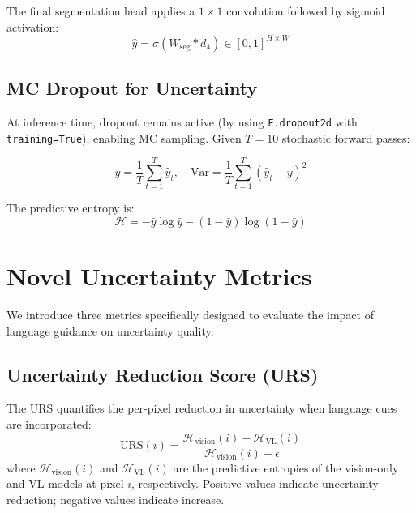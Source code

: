 The final segmentation head applies a $1 \times 1$ convolution followed by sigmoid activation:
\begin{equation}
	\hat{y} = \sigma(W_{\text{seg}} \ast d_4) \in [0, 1]^{H \times W}
\end{equation}


\subsection{MC Dropout for Uncertainty}
\label{sec:approach:mc_inference}

At inference time, dropout remains active (by using \texttt{F.dropout2d} with \texttt{training=True}), enabling \ac{MC} sampling. Given $T = 10$ stochastic forward passes:

\begin{equation}
	\bar{y} = \frac{1}{T}\sum_{t=1}^{T} \hat{y}_t, \quad
	\text{Var} = \frac{1}{T}\sum_{t=1}^{T} (\hat{y}_t - \bar{y})^2
\end{equation}

The predictive entropy is:
\begin{equation}
	\mathcal{H} = -\bar{y}\log\bar{y} - (1 - \bar{y})\log(1 - \bar{y})
\end{equation}


\section{Novel Uncertainty Metrics}
\label{sec:approach:metrics}

We introduce three metrics specifically designed to evaluate the impact of language guidance on uncertainty quality.

\subsection{Uncertainty Reduction Score (URS)}
\label{sec:approach:urs}

The \ac{URS} quantifies the per-pixel reduction in uncertainty when language cues are incorporated:
\begin{equation}
	\text{URS}(i) = \frac{\mathcal{H}_{\text{vision}}(i) - \mathcal{H}_{\text{VL}}(i)}{\mathcal{H}_{\text{vision}}(i) + \epsilon}
\end{equation}
where $\mathcal{H}_{\text{vision}}(i)$ and $\mathcal{H}_{\text{VL}}(i)$ are the predictive entropies of the vision-only and \ac{VL} models at pixel $i$, respectively. Positive values indicate uncertainty reduction; negative values indicate increase.

